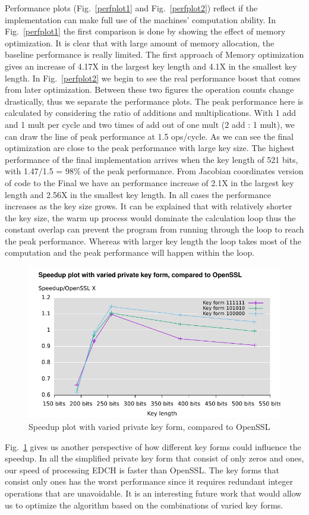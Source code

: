 Performance plots (Fig.~\ref{perfplot1} and Fig.~\ref{perfplot2}) reflect if the implementation can make full use of the machines' computation ability. In Fig.~\ref{perfplot1} the first comparison is done by showing the effect of memory optimization. It is clear that with large amount of memory allocation, the baseline performance is really limited. The first approach of Memory optimization gives an increase of 4.17X in the largest key length and 4.1X in the smallest key length. In Fig.~\ref{perfplot2} we begin to see the real performance boost that comes from later optimization. Between these two figures the operation counts change drastically, thus we separate the performance plots. The peak performance here is calculated by considering the ratio of additions and multiplications. With 1 add and 1 mult per cycle and two times of add out of one mult (2 add : 1 mult), we can draw the line of peak performance at 1.5 ops/cycle. As we can see the final optimization are close to the peak performance with large key size. The highest performance of the final implementation arrives when the key length of 521 bits, with 1.47/1.5 = 98\% of the peak performance. From Jacobian coordinates version of code to the Final we have an performance increase of 2.1X in the largest key length and 2.56X in the smallest key length. In all cases the performance increases as the key size grows. It can be explained that with relatively shorter the key size, the warm up process would dominate the calculation loop thus the constant overlap can prevent the program from running through the loop to reach the peak performance. Whereas with larger key length the loop takes most of the computation and the peak performance will happen within the loop.

\begin{figure}[h!]\centering
  \includegraphics[scale=0.7]{keysize}
  \caption{Speedup plot with varied private key form, compared to OpenSSL\label{keysize}}
\end{figure}

Fig.~\ref{keysize} gives us another perspective of how different key forms could influence the speedup.  In all the simplified private key form that consist of only zeros and ones, our speed of processing EDCH is faster than OpenSSL. The key forms that consist only ones has the worst performance since it requires redundant integer operations that are unavoidable. It is an interesting future work that would allow us to optimize the algorithm based on the combinations of varied key forms. 